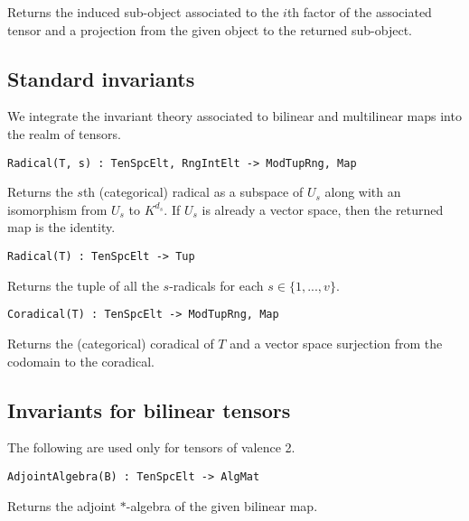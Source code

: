 Returns the induced sub-object associated to the $i$th factor of the 
associated 
tensor and a projection from the given object to the returned sub-object.

\subsection{Standard invariants}

We integrate the invariant theory associated to bilinear and multilinear maps
into the realm of tensors. 

\color{blue}
{\small \begin{verbatim}
Radical(T, s) : TenSpcElt, RngIntElt -> ModTupRng, Map
\end{verbatim} }
\color{black}

Returns the $s$th (categorical) radical as a subspace of $U_s$ along with an isomorphism from $U_s$ to $K^{d_s}$.
If $U_s$ is already a vector space, then the returned map is the identity.

\color{blue}
{\small \begin{verbatim}
Radical(T) : TenSpcElt -> Tup
\end{verbatim} }
\color{black}

Returns the tuple of all the $s$-radicals for each $s\in \{1,...,v\}$.

\color{blue}
{\small \begin{verbatim}
Coradical(T) : TenSpcElt -> ModTupRng, Map
\end{verbatim} }
\color{black}

Returns the (categorical) coradical of $T$ and a vector space surjection from 
the codomain to the coradical.

\subsection{Invariants for bilinear tensors}

The following are used only for tensors of valence 2.

\color{blue}
{\small \begin{verbatim}
AdjointAlgebra(B) : TenSpcElt -> AlgMat
\end{verbatim} }
\color{black}

Returns the adjoint $*$-algebra of the given bilinear map. 

